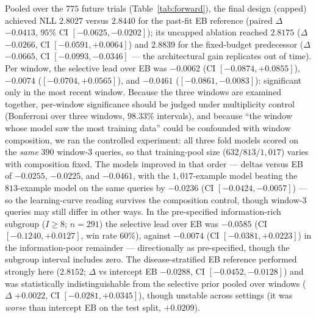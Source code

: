\documentclass[11pt]{article}
\begin{document}
Pooled over the $775$ future trials (Table~\ref{tab:forward}), the final
design (capped) achieved NLL $2.8027$ versus $2.8440$ for the past-fit EB
reference (paired $\Delta$ $-0.0413$, $95\%$ CI $[-0.0625,-0.0202]$); its
uncapped ablation reached $2.8175$
($\Delta$ $-0.0266$, CI $[-0.0591,+0.0064]$) and $2.8839$ for
the fixed-budget predecessor ($\Delta$ $-0.0665$, CI $[-0.0993,-0.0346]$ ---
the architectural gain replicates out of time). Per window, the selective
lead over EB was $-0.0062$ (CI $[-0.0874,+0.0855]$), $-0.0074$
($[-0.0704,+0.0565]$), and $-0.0461$ ($[-0.0861,-0.0083]$): significant only
in the most recent window. Because the three windows are examined together,
per-window significance should be judged under multiplicity control
(Bonferroni over three windows, $98.33\%$ intervals), and because ``the
window whose model saw the most training data'' could be confounded with
window composition, we ran the controlled experiment: all three fold models
scored on the \emph{same} $390$ window-3 queries, so that training-pool size
($632/813/1{,}017$) varies with composition fixed. The models improved in
that order --- deltas versus EB of $-0.0255$, $-0.0225$, and $-0.0461$, with
the $1{,}017$-example model beating the $813$-example model on the same
queries by $-0.0236$ (CI $[-0.0424,-0.0057]$) --- so the learning-curve
reading survives the composition control, though window-3 queries may still
differ in other ways. In the pre-specified
information-rich subgroup ($I \ge 8$; $n=291$) the selective lead over EB was
$-0.0585$ (CI $[-0.1240,+0.0127]$, win rate $60\%$), against $-0.0074$
(CI $[-0.0381,+0.0223]$) in the information-poor remainder --- directionally
as pre-specified, though the subgroup interval includes zero. The
disease-stratified EB reference performed strongly here ($2.8152$; $\Delta$ vs
intercept EB $-0.0288$, CI $[-0.0452,-0.0128]$) and was statistically
indistinguishable from the selective prior pooled over windows ($\Delta$
$+0.0022$, CI $[-0.0281,+0.0345]$), though unstable across settings (it was
\emph{worse} than intercept EB on the test split, $+0.0209$).
\end{document}
